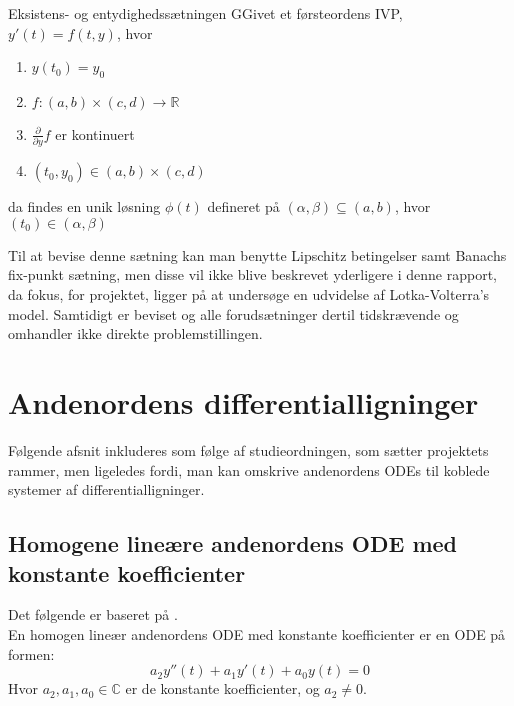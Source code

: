 \begin{mytheo}{Eksistens- og entydighedssætningen}
GGivet et førsteordens IVP, $y'(t)=f(t,y)$, hvor 

\begin{enumerate}
    \item $y(t_0)=y_0$
    \item $f:(a,b) \times (c,d) \rightarrow \mathbb{R}$
    \item $\frac{\partial}{\partial y}f$ er kontinuert
    \item $(t_0,y_0) \in (a,b) \times (c,d)$
\end{enumerate}

da findes en unik løsning $\phi(t)$ defineret på $(\alpha,\beta)\subseteq (a,b)$, hvor $(t_0) \in (\alpha, \beta)$ 
\end{mytheo}

Til at bevise denne sætning kan man benytte Lipschitz betingelser samt Banachs fix-punkt sætning, men disse vil ikke blive beskrevet yderligere i denne rapport, da fokus, for projektet, ligger på at undersøge en udvidelse af Lotka-Volterra's model. Samtidigt er beviset og alle forudsætninger dertil tidskrævende og omhandler ikke direkte problemstillingen. 

\section{Andenordens differentialligninger}
Følgende afsnit inkluderes som følge af studieordningen, som sætter projektets rammer, men ligeledes fordi, man kan omskrive andenordens ODEs til koblede systemer af differentialligninger.
\subsection{Homogene lineære andenordens ODE med konstante koefficienter}
Det følgende er baseret på \citep[s. 221]{JAB}. \\ \hfill \break En homogen lineær andenordens ODE med konstante koefficienter er en ODE på formen: \hfill \break
\begin{equation}
\label{homlinandord}
    a_2y''(t)+a_1y'(t)+a_0y(t)=0
\end{equation} \hfill \break
Hvor $a_2,a_1,a_0\in \mathbb{C}$ er de konstante koefficienter, og $a_2\neq 0$. \hfill \break

